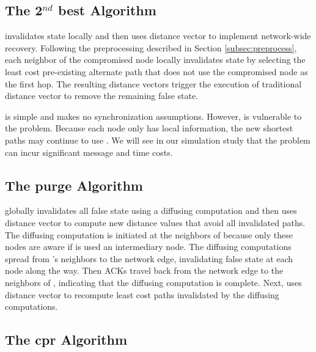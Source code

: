 \subsection{The 2$^{nd}$ best Algorithm}
\label{subsec:second}
\second invalidates state locally and then uses distance vector to implement network-wide recovery.  Following the preprocessing described in Section \ref{subsec:preprocess}, 
each neighbor of the compromised node locally invalidates state by selecting the least cost pre-existing alternate path that does not use the compromised node as the first hop.
The resulting distance vectors trigger the execution of traditional distance vector to remove the remaining false state.

\second is simple and makes no synchronization assumptions. 
However, \second is vulnerable to the \infinity problem. Because each node only has local information, the new shortest paths may continue to use \bads.
We will see in our simulation study that the \infinity problem can incur significant message and time costs.



\subsection{The purge Algorithm}
\label{subsec:purge}


\purge globally invalidates all false state using a diffusing computation and then uses distance vector to compute new distance values that avoid all invalidated paths.
The diffusing computation is initiated at the neighbors of \bad because only these nodes are 
aware if \bad is used an intermediary node. The diffusing computations spread from \bads's neighbors to the network edge, invalidating false state at each node along the way. 
Then ACKs travel back from the network edge to the neighbors of \bads, indicating that the diffusing computation is complete. 
Next, \purge uses distance vector to recompute least cost paths invalidated by the diffusing computations.



\subsection{The cpr Algorithm}
\label{subsec:cpr}

